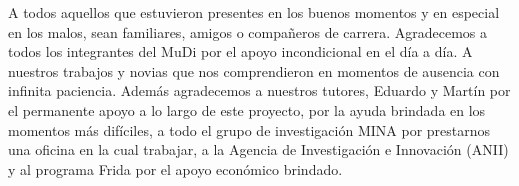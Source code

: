 
\begin{acknowledgements}      
A todos aquellos que estuvieron presentes en los buenos momentos y en especial en los malos, sean familiares, amigos o compa\~neros de carrera. Agradecemos a todos los integrantes del MuDi por el apoyo incondicional en el día a día. A nuestros trabajos y novias que nos comprendieron en momentos de ausencia con infinita paciencia. Adem\'as agradecemos a nuestros tutores, Eduardo y Martín por el permanente apoyo a lo largo de este proyecto, por la ayuda brindada en los momentos m\'as difíciles, a todo el grupo de investigaci\'on MINA por prestarnos una oficina en la cual trabajar, a la Agencia de Investigaci\'on e Innovaci\'on (ANII) y al programa Frida por el apoyo económico brindado.


\end{acknowledgements}
